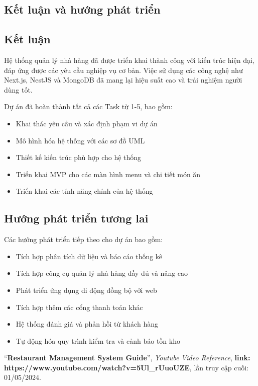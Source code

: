\documentclass[a4paper]{article}
\begin{document}
\begin{itemize}
\section{Kết luận và hướng phát triển}
    \subsection{Kết luận}
    Hệ thống quản lý nhà hàng đã được triển khai thành công với kiến trúc hiện đại, đáp ứng được các yêu cầu nghiệp vụ cơ bản. Việc sử dụng các công nghệ như Next.js, NestJS và MongoDB đã mang lại hiệu suất cao và trải nghiệm người dùng tốt.
    
    Dự án đã hoàn thành tất cả các Task từ 1-5, bao gồm:
    \begin{itemize}
        \item Khai thác yêu cầu và xác định phạm vi dự án
        \item Mô hình hóa hệ thống với các sơ đồ UML
        \item Thiết kế kiến trúc phù hợp cho hệ thống
        \item Triển khai MVP cho các màn hình menu và chi tiết món ăn
        \item Triển khai các tính năng chính của hệ thống
    \end{itemize}
    
    \subsection{Hướng phát triển tương lai}
    Các hướng phát triển tiếp theo cho dự án bao gồm:
    \begin{itemize}
        \item Tích hợp phân tích dữ liệu và báo cáo thống kê
        \item Tích hợp công cụ quản lý nhà hàng đầy đủ và nâng cao
        \item Phát triển ứng dụng di động đồng bộ với web
        \item Tích hợp thêm các cổng thanh toán khác
        \item Hệ thống đánh giá và phản hồi từ khách hàng
        \item Tự động hóa quy trình kiểm tra và cảnh báo tồn kho
    \end{itemize}

\newpage

\begin{thebibliography}{80}

``\textbf{Restaurant Management System Guide}'',
\textit{Youtube Video Reference}, 
\textbf{link: https://www.youtube.com/watch?v=5Ul\_rUuoUZE},
lần truy cập cuối: 01/05/2024.


\end{thebibliography}
\end{itemize}
\end{document}
